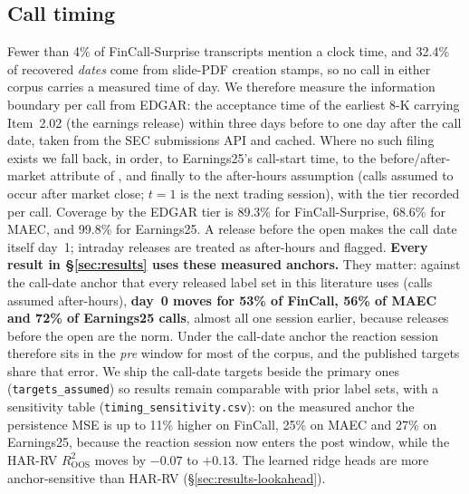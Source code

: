 \subsection{Call timing}
\label{sec:timing}
Fewer than 4\% of FinCall-Surprise transcripts mention a clock time, and 32.4\% of
recovered \emph{dates} come from slide-PDF creation stamps, so no call in either
corpus carries a measured time of day. We therefore measure the information boundary
per call from EDGAR: the acceptance time of the earliest 8-K carrying Item~2.02 (the
earnings release) within three days before to one day after the call date, taken
from the SEC submissions API and cached. Where no such filing exists we fall back, in
order, to Earnings25's call-start time, to the before/after-market attribute of
\citet{scss2024}, and finally to the after-hours assumption (calls assumed to occur
after market close; $t{=}1$ is the next trading session), with the tier recorded per
call. Coverage by the EDGAR tier is 89.3\% for FinCall-Surprise, 68.6\% for MAEC, and
99.8\% for Earnings25. A release before the open makes the call date itself day~1;
intraday releases are treated as after-hours and flagged. \textbf{Every result in
\S\ref{sec:results} uses these measured anchors.} They matter: against the call-date
anchor that every released label set in this literature uses (calls assumed
after-hours), \textbf{day~0 moves for 53\% of FinCall, 56\% of MAEC and 72\% of
Earnings25 calls}, almost all one session earlier, because releases before the open
are the norm. Under the call-date anchor the reaction session therefore sits in the
\emph{pre} window for most of the corpus, and the published targets share that
error. We ship the call-date targets beside the primary ones
(\texttt{targets\_assumed}) so results remain comparable with prior label sets, with a
sensitivity table (\texttt{timing\_sensitivity.csv}): on the measured anchor the
persistence MSE is up to 11\% higher on FinCall, 25\% on MAEC and 27\% on Earnings25,
because the reaction session now enters the post window, while the HAR-RV
$R^2_{\mathrm{OOS}}$ moves by $-0.07$ to $+0.13$. The learned ridge heads are more
anchor-sensitive than HAR-RV (\S\ref{sec:results-lookahead}).


